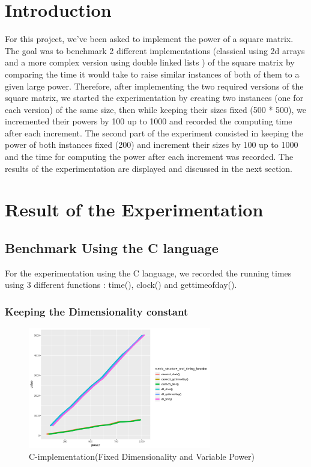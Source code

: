 \documentclass[12pt]{article}
\begin{document}
	\section{Introduction}
		For this project, we've been asked to implement the power of a square matrix. The goal was to benchmark 2 different implementations (classical using 2d arrays and a more complex version using double linked lists ) of the square matrix by comparing the time it would take to raise similar instances of both of them to a given large power. Therefore, after implementing the two required versions of the square matrix, we started the experimentation by creating two instances (one for each version) of the same size, then while  keeping their sizes fixed (500 * 500), we incremented their powers by 100 up to 1000 and recorded the computing time after each increment. The second part of the experiment consisted in keeping the power of both instances fixed (200) and increment their sizes by 100 up to 1000 and the time for computing the power after each increment was recorded. The results of the experimentation are displayed and discussed in the next section.
		
	\section{Result of the Experimentation}
		\subsection{Benchmark Using the C language}
			For the experimentation using the C language, we recorded the running times using 3 different functions : time(), clock() and gettimeofday().
			\subsubsection{Keeping the Dimensionality constant}
				\begin{figure}[h]
					\includegraphics[width= 8cm]{../images/C_fixed_dim.png}
					\caption{C-implementation(Fixed Dimensionality and Variable Power)}
				\end{figure}
		
\end{document}
